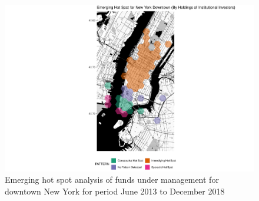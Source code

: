\begin{figure}
	\centering
	\includegraphics[width=1\linewidth]{Figures/ChapterIV/NY_Money_EH_Downtown}
	\caption[Emerging Hot Spot Analysis of Funds Under Management for Downtown New York 2013-2018]{Emerging hot spot analysis of funds under management for downtown New York for period June 2013 to December 2018}
	\label{fig:NYCmoneyhotspot_Downtown}
\end{figure}


